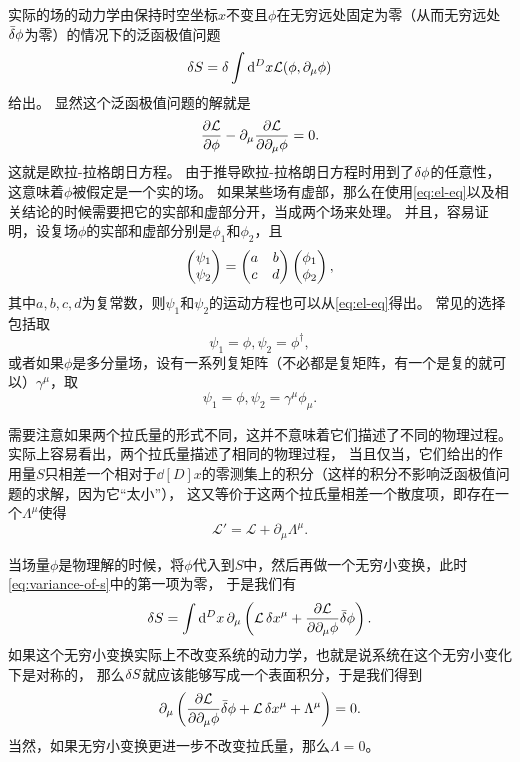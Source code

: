 \documentclass[UTF8, a4paper]{ctexart}
\begin{document}
实际的场的动力学由保持时空坐标$x$不变且$\phi$在无穷远处固定为零（从而无穷远处$\bar{\var}{\phi}$为零）的情况下的泛函极值问题
\begin{equation}
    \var{S} = \var{\int \dd[D]x \mathcal{L}(\phi, \partial_\mu \phi)}
    \label{eq:min-action}
\end{equation}
给出。
显然这个泛函极值问题的解就是
\begin{equation}
    \pdv{\mathcal{L}}{\phi} - \partial_\mu \pdv{\mathcal{L}}{\partial_\mu \phi} = 0.
    \label{eq:el-eq}
\end{equation}
这就是欧拉-拉格朗日方程。
由于推导欧拉-拉格朗日方程时用到了$\var{\phi}$的任意性，这意味着$\phi$被假定是一个实的场。
如果某些场有虚部，那么在使用\eqref{eq:el-eq}以及相关结论的时候需要把它的实部和虚部分开，当成两个场来处理。
并且，容易证明，设复场$\phi$的实部和虚部分别是$\phi_1$和$\phi_2$，且
\[
    \pmqty{\psi_1 \\ \psi_2} = \pmqty{a & b \\ c & d} \pmqty{\phi_1 \\ \phi_2},
\]
其中$a,b,c,d$为复常数，则$\psi_1$和$\psi_2$的运动方程也可以从\eqref{eq:el-eq}得出。
常见的选择包括取
\[
    \psi_1 = \phi, \psi_2 = \phi^\dagger,
\]
或者如果$\phi$是多分量场，设有一系列复矩阵（不必都是复矩阵，有一个是复的就可以）$\gamma^\mu$，取
\[
    \psi_1 = \phi, \psi_2 = \gamma^\mu \phi_\mu.
\]

需要注意如果两个拉氏量的形式不同，这并不意味着它们描述了不同的物理过程。
实际上容易看出，两个拉氏量描述了相同的物理过程，
当且仅当，它们给出的作用量$S$只相差一个相对于$\dd[D]{x}$的零测集上的积分（这样的积分不影响泛函极值问题的求解，因为它“太小”），
这又等价于这两个拉氏量相差一个散度项，即存在一个$\Lambda^\mu$使得
\begin{equation}
\mathcal{L}' = \mathcal{L} + \partial_\mu \Lambda^\mu.
\end{equation}

当场量$\phi$是物理解的时候，将$\phi$代入到$S$中，然后再做一个无穷小变换，此时\eqref{eq:variance-of-s}中的第一项为零，
于是我们有
\[
    \var{S} = \int \dd[D]{x} \partial_\mu \left( \mathcal{L} \var{x}^\mu + \pdv{\mathcal{L}}{\partial_\mu \phi} \bar{\var}\phi \right).
\]
如果这个无穷小变换实际上不改变系统的动力学，也就是说系统在这个无穷小变化下是对称的，
那么$\var{S}$就应该能够写成一个表面积分，于是我们得到
\begin{equation}
    \partial_\mu \left(\pdv{\mathcal{L}}{\partial_\mu \phi} \bar{\var}\phi + \mathcal{L} \var{x^\mu} + \Lambda^\mu\right) = 0.
    \label{eq:noether}
\end{equation}
当然，如果无穷小变换更进一步不改变拉氏量，那么$\Lambda=0$。
\end{document}
